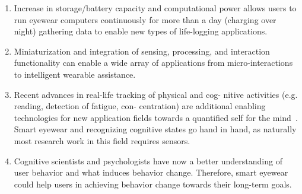 \documentclass{sigchi-ext}
\begin{document}
\begin{enumerate}
  \item Increase in storage/battery capacity and computational power allows users to run eyewear computers continuously for more than a day (charging over night) gathering data to enable new types of life-logging applications.
  \item Miniaturization and integration of sensing, processing, and interaction functionality can enable a wide array of applications from micro-interactions to intelligent wearable assistance.
  \item Recent advances in real-life tracking of physical and cog- nitive activities (e.g. reading, detection of fatigue, con- centration) are additional enabling technologies for new application fields towards a quantified self for the mind~\cite{kunze2015quantifying}. Smart eyewear and recognizing cognitive states go hand in hand, as naturally most research work in this field requires sensors.
  \item Cognitive scientists and psychologists have now a better understanding of user behavior and what induces behavior change. Therefore, smart eyewear could help users in achieving behavior change towards their long-term goals.
\end{enumerate}
\end{document}
